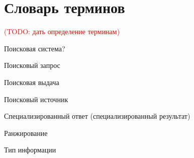 \documentclass[12pt,a4paper]{report}
\newcommand\note[1]{\textcolor{red}{(#1)}}
\newcommand\todonote[1]{\note{TODO: #1}}
\begin{document}
\chapter*{Словарь терминов}

\todonote{дать определение терминам}

Поисковая система?

Поисковый запрос

Поисковая выдача


Поисковый источник

Специализированный ответ (специализированный результат)

Ранжирование

Тип информации
\end{document}
